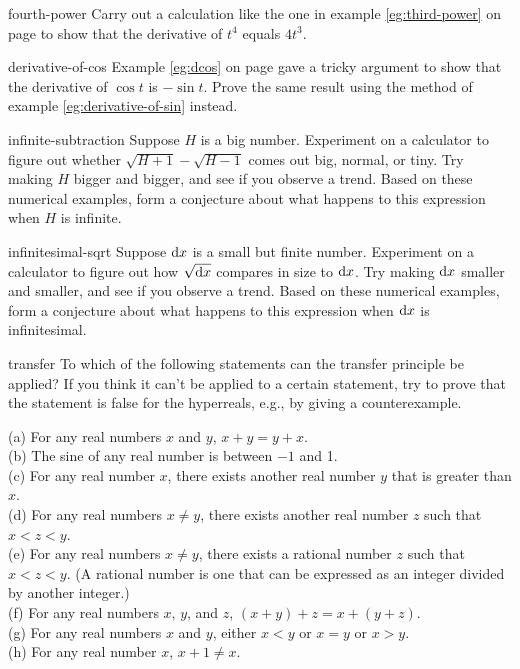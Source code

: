 \begin{hwsection}

\begin{hwwithsoln}{fourth-power}
Carry out a calculation like the one in example \ref{eg:third-power} on page \pageref{eg:third-power} to
show that the derivative of $t^4$ equals $4t^3$.
\end{hwwithsoln}

\begin{hwwithsoln}{derivative-of-cos}
Example \ref{eg:dcos} on page \pageref{eg:dcos} gave a tricky argument to show that the derivative of
$\cos t$ is $-\sin t$. Prove the same result using the method of example \ref{eg:derivative-of-sin} instead.
\end{hwwithsoln}

\begin{hwwithsoln}{infinite-subtraction}
Suppose $H$ is a big number. Experiment on a calculator to figure out whether $\sqrt{H+1}-\sqrt{H-1}$
comes out big, normal, or tiny. Try making $H$ bigger and bigger, and see if you observe a trend.
Based on these numerical examples, form a conjecture about what happens to this expression when $H$ is infinite.
\end{hwwithsoln}

\begin{hwwithsoln}{infinitesimal-sqrt}
Suppose $\textup{d} x$ is a small but finite number. Experiment on a calculator to figure out how $\sqrt{\textup{d} x}$
compares in size to $\textup{d} x$.  Try making $\textup{d} x$ smaller and smaller, and see if you observe a trend.
Based on these numerical examples, form a conjecture about what happens to this expression when $\textup{d} x$ is
infinitesimal.
\end{hwwithsoln}

\begin{hwwithsoln}{transfer}
To which of the following statements can the transfer principle be applied? If you think it can't be applied
to a certain statement, try to prove that the statement is false for the hyperreals, e.g., by giving a
counterexample.

(a) For any real numbers $x$ and $y$, $x+y=y+x$.\\
(b) The sine of any real number is between $-1$ and 1.\\
(c) For any real number $x$, there exists another real number $y$ that is greater than $x$.\\
(d) For any real numbers $x\ne y$, there exists another real number $z$ such that $x<z<y$.\\
(e) For any real numbers $x\ne y$, there exists a rational number $z$ such that $x<z<y$. (A rational number is
one that can be expressed as an integer divided by another integer.)\\
(f) For any real numbers $x$, $y$, and $z$, $(x+y)+z=x+(y+z)$.\\
(g) For any real numbers $x$ and $y$, either $x<y$ or $x=y$ or $x>y$.\\
(h) For any real number $x$, $x+1\ne x$.
\end{hwwithsoln}


\end{hwsection}
